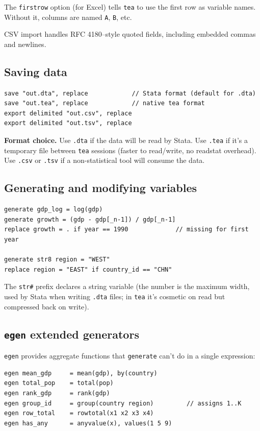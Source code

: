 \documentclass[11pt,letterpaper]{article}
\begin{document}
The \texttt{firstrow} option (for Excel) tells \texttt{tea} to use the
first row as variable names.  Without it, columns are named \texttt{A},
\texttt{B}, etc.

CSV import handles RFC 4180–style quoted fields, including embedded
commas and newlines.

\subsection{Saving data}

\begin{lstlisting}
save "out.dta", replace            // Stata format (default for .dta)
save "out.tea", replace            // native tea format
export delimited "out.csv", replace
export delimited "out.tsv", replace
\end{lstlisting}

\textbf{Format choice.}  Use \texttt{.dta} if the data will be read by
Stata.  Use \texttt{.tea} if it's a temporary file between \texttt{tea}
sessions (faster to read/write, no readstat overhead).  Use \texttt{.csv}
or \texttt{.tsv} if a non-statistical tool will consume the data.

\subsection{Generating and modifying variables}

\begin{lstlisting}
generate gdp_log = log(gdp)
generate growth = (gdp - gdp[_n-1]) / gdp[_n-1]
replace growth = . if year == 1990             // missing for first year

generate str8 region = "WEST"
replace region = "EAST" if country_id == "CHN"
\end{lstlisting}

The \texttt{str\#} prefix declares a string variable (the number is the
maximum width, used by Stata when writing \texttt{.dta} files; in
\texttt{tea} it's cosmetic on read but compressed back on write).

\subsection{\texttt{egen} extended generators}

\texttt{egen} provides aggregate functions that \texttt{generate} can't
do in a single expression:

\begin{lstlisting}
egen mean_gdp     = mean(gdp), by(country)
egen total_pop    = total(pop)
egen rank_gdp     = rank(gdp)
egen group_id     = group(country region)         // assigns 1..K
egen row_total    = rowtotal(x1 x2 x3 x4)
egen has_any      = anyvalue(x), values(1 5 9)
\end{lstlisting}
\end{document}
